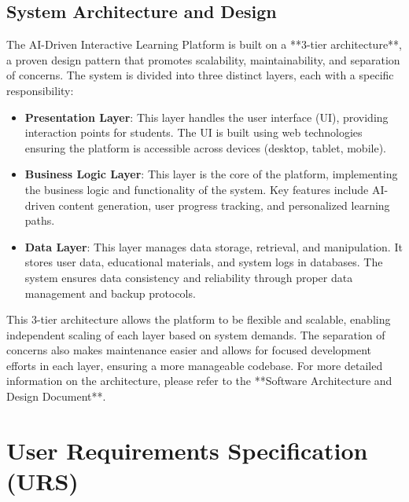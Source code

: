 \documentclass[12pt]{article}
\begin{document}
\subsection{System Architecture and Design}
The AI-Driven Interactive Learning Platform is built on a **3-tier architecture**, a proven design pattern that promotes scalability, maintainability, and separation of concerns. The system is divided into three distinct layers, each with a specific responsibility:

\begin{itemize}
    \item \textbf{Presentation Layer}: This layer handles the user interface (UI), providing interaction points for  students. The UI is built using web technologies ensuring the platform is accessible across devices (desktop, tablet, mobile).
    \item \textbf{Business Logic Layer}: This layer is the core of the platform, implementing the business logic and functionality of the system. Key features include AI-driven content generation, user progress tracking, and personalized learning paths.
    \item \textbf{Data Layer}: This layer manages data storage, retrieval, and manipulation. It stores user data, educational materials, and system logs in databases. The system ensures data consistency and reliability through proper data management and backup protocols.
\end{itemize}

This 3-tier architecture allows the platform to be flexible and scalable, enabling independent scaling of each layer based on system demands. The separation of concerns also makes maintenance easier and allows for focused development efforts in each layer, ensuring a more manageable codebase. For more detailed information on the architecture, please refer to the **Software Architecture and Design Document**.



\newpage

\section{User Requirements Specification (URS)}
\end{document}
